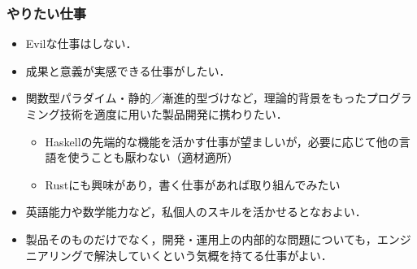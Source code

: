 \documentclass[a4j]{ltjsarticle}
\begin{document}
\subsubsection*{やりたい仕事}
\begin{itemize}
  \item Evilな仕事はしない．
  \item 成果と意義が実感できる仕事がしたい．
  \item 関数型パラダイム・静的／漸進的型づけなど，理論的背景をもったプログラミング技術を適度に用いた製品開発に携わりたい．
  \begin{itemize}
    \item Haskellの先端的な機能を活かす仕事が望ましいが，必要に応じて他の言語を使うことも厭わない（適材適所）
    \item Rustにも興味があり，書く仕事があれば取り組んでみたい
  \end{itemize}
  \item 英語能力や数学能力など，私個人のスキルを活かせるとなおよい．
  \item 製品そのものだけでなく，開発・運用上の内部的な問題についても，エンジニアリングで解決していくという気概を持てる仕事がよい．
\end{itemize}

\end{document}
